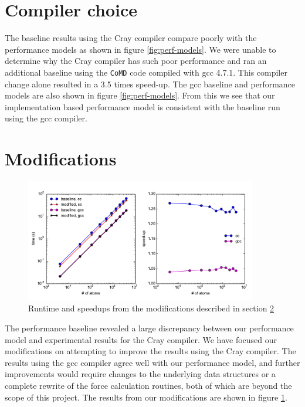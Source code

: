 \documentclass[12pt]{article}
\begin{document}
\section{Compiler choice}
The baseline results using the Cray compiler compare poorly with the
performance models as shown in figure \ref{fig:perf-models}. We were
unable to determine why the Cray compiler has such poor performance
and ran an additional baseline using the \texttt{CoMD} code compiled
with gcc 4.7.1. This compiler change alone resulted in a 3.5 times
speed-up. The gcc baseline and performance models are also shown in
figure \ref{fig:perf-models}. From this we see that our implementation
based performance model is consistent with the baseline run using the
gcc compiler.


\section{Modifications}
\label{sec:mods}

\begin{figure}[h!]
  \centering
  \includegraphics[width=0.9\textwidth]{../figs/modified_forceLJ.pdf}
  \caption{Runtime and speedups from the modifications described in
   section \ref{sec:mods}}
   \label{fig:mod-force}
\end{figure}

The performance baseline revealed a large discrepancy between our
performance model and experimental results for the Cray compiler. We
have focused our modifications on attempting to improve the results
using the Cray compiler. The results using the gcc compiler agree well
with our performance model, and further improvements would require
changes to the underlying data structures or a complete rewrite of the
force calculation routines, both of which are beyond the scope of this
project. The results from our modifications are shown in figure
\ref{fig:mod-force}.
\\
\end{document}
